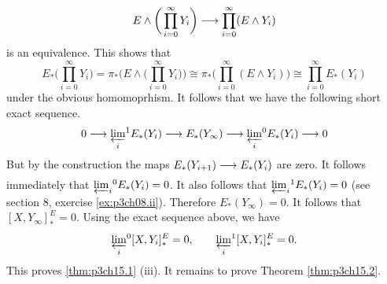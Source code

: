 \documentclass[../main]{subfiles}
\begin{document}
\[E\wedge\bigg(\prod_{i=0}^\infty Y_i \bigg)\lar{}\prod_{i=0}^\infty (E\wedge Y_i) \]
is an equivalence. This shows that \[E_\ast\bigg(\prod_{i=0}^\infty Y_i \bigg)= \pi_\ast\bigg(E\wedge \bigg(\prod_{i=0}^\infty Y_i \bigg)\bigg) \cong \pi_\ast\bigg(\prod_{i=0}^\infty (E\wedge Y_i) \bigg)\cong \prod_{i=0}^\infty E_\ast(Y_i)\]
under the obvious homomoprhism. It follows that we have the following short exact sequence.
\[0\lar{} \varprojlim_i\!^1E_\ast(Y_i) \lar{} E_\ast(Y_\infty)\lar{}\varprojlim_i\!^0 E_\ast(Y_i)\lar{} 0\]
But by the construction the maps $E_\ast(Y_{i+1})\lar{}E_\ast(Y_i)$ are zero. It follows immediately that $\varprojlim_i\!^0E_\ast(Y_i)=0$. It also follows that $\varprojlim_i\!^1E_\ast(Y_i)=0$ (see section 8, exercise \ref{ex:p3ch08.ii}). Therefore $E_\ast(Y_\infty)=0$. It follows that $[X,Y_\infty]_\ast^E=0$. Using the exact sequence above, we have
\[\varprojlim_i\!^0[X,Y_i]^E_\ast=0,\qquad \varprojlim_i\!^1[X,Y_i]^E_\ast=0.\]
This proves \ref{thm:p3ch15.1} (iii). It remains to prove Theorem \ref{thm:p3ch15.2}.
\end{document}
